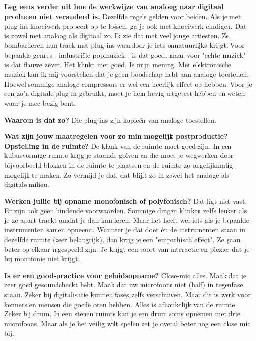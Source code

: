 \textbf{Leg eens verder uit hoe de werkwijze van analoog naar digitaal producen niet veranderd is.}\newline
Dezelfde regels gelden voor beiden. Als je met plug-ins knoeiwerk probeert op te lossen, ga je ook met knoeiwerk eindigen.
Dat is zowel met analoog als digitaal zo. Ik zie dat met veel jonge artiesten. Ze bombarderen hun track met plug-ins waardoor je iets onnatuurlijks krijgt.
Voor bepaalde genres - industriële popmuziek - is dat goed, maar voor "echte muziek" is dat flauwe zever. Het klinkt niet goed. Is mijn mening.
Met elektronische muziek kan ik mij voorstellen dat je geen boodschap hebt aan analoge toestellen. Hoewel sommige analoge compressors er wel een heerlijk effect op hebben.
Voor je een zo'n digitale plug-in gebruikt, moet je hem hevig uitgetest hebben en weten waar je mee bezig bent.

\textbf{Waarom is dat zo?}\newline
Die plug-ins zijn kopieën van analoge toestellen.

\textbf{Wat zijn jouw maatregelen voor zo min mogelijk postproductie? Opstelling in de ruimte?}\newline
De klank van de ruimte moet goed zijn. In een kubusvormige ruimte krijg je staande golven en die moet je wegwerken door bijvoorbeeld
blokken in de ruimte te plaatsen en de ruimte zo ongelijkmatig mogelijk te maken. Zo vermijd je dat, dat blijft zo in zowel het analoge als digitale milieu.

\textbf{Werken jullie bij opname monofonisch of polyfonisch?}\newline
Dat ligt niet vast. Er zijn ook geen bindende voorwaarden. Sommige dingen klinken zelfs leuker als je ze apart trackt omdat je dan kan leren.
Maar het heeft wel iets als je bepaalde instrumenten samen opneemt. Wanneer je dat doet én de instrumenten staan in dezelfde ruimte (zeer belangrijk), dan krijg je een "empathisch effect". Ze gaan beter op elkaar ingespeeld zijn.
Je krijgt een soort van interactie en plezier dat je bij monofonie niet krijgt.

\textbf{Is er een good-practice voor geluidsopname?}\newline
Close-mic alles. Maak dat je zeer goed gesoundcheckt hebt. Maak dat uw microfoons niet (half) in tegenfase staan.
Zeker bij digitalisatie kunnen fases zelfs verschuiven. Maar dit is werk voor kenners en mensen die goede oren hebben.
Alles is afhankelijk van de ruimte. Zeker bij drum. In een stenen ruimte kan je een drum soms opnemen met drie microfoons.
Maar als je het veilig wilt spelen zet je overal beter nog een close mic bij.

